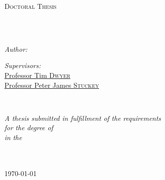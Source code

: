 \documentclass[
11pt, %
english, %
singlespacing, %
headsepline, %
]{MastersDoctoralThesis} %
\author{Shuai \textsc{Fu}} %
\begin{document}
\frontmatter %

\pagestyle{plain} %


\begin{titlepage}
\begin{center}

\vspace*{.06\textheight}
{\scshape\LARGE \univname\par}\vspace{1.5cm} %
\textsc{\Large Doctoral Thesis}\\[0.5cm] %

\HRule \\[0.4cm] %
{\huge \bfseries \ttitle\par}\vspace{0.4cm} %
\HRule \\[1.5cm] %
 
\begin{minipage}[t]{0.4\textwidth}
\begin{flushleft} \large
\emph{Author:}\\
\href{http://www.johnsmith.com}{\authorname} %
\end{flushleft}
\end{minipage}
\begin{minipage}[t]{0.4\textwidth}
\begin{flushright} \large
\emph{Supervisors:} \\
\href{http://www.jamessmith.com}{Professor Tim \textsc{Dwyer}} \\
\href{http://www.jamessmith.com}{Professor Peter James \textsc{Stuckey}} 

\end{flushright}
\end{minipage}\\[3cm]
 
\vfill

\large \textit{A thesis submitted in fulfillment of the requirements\\ for the degree of \degreename}\\[0.3cm] %
\textit{in the}\\[0.4cm]
\groupname\\\deptname\\[2cm] %
 
\vfill

{\large \today}\\[4cm] %
 
\vfill
\end{center}
\end{titlepage}
\end{document}
